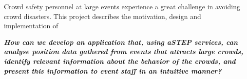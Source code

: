 \begin{center}
Crowd safety personnel at large events experience a great challenge in avoiding crowd disasters. This project describes the motivation, design and implementation of 

\textbf{\textit{How can we develop an application that, using aSTEP services, can analyse position data gathered from events that attracts large crowds, identify relevant information about the behavior of the crowds, and present this information to event staff in an intuitive manner?}}





\end{center}
